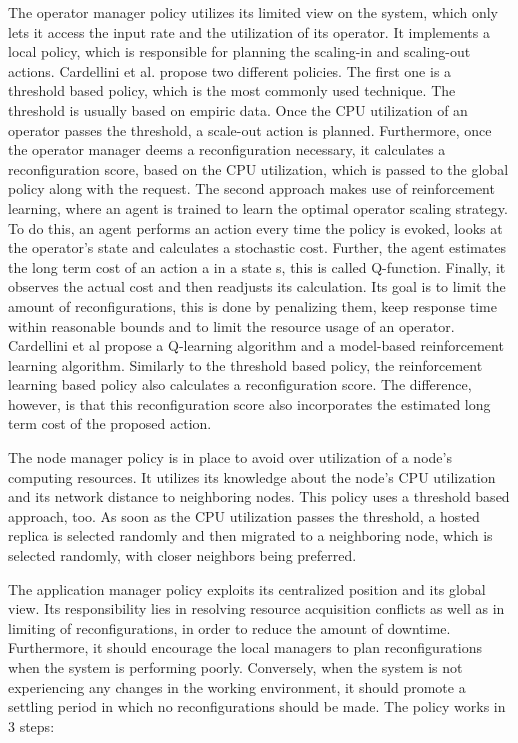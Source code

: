         \quad The operator manager policy utilizes its limited view on the system, which only lets it access the input rate and the utilization of its operator.
        It implements a local policy, which is responsible for planning the scaling-in and scaling-out actions. Cardellini et al. propose two different policies.
        The first one is a threshold based policy, which is the most commonly used technique. The threshold is usually based on empiric data. Once the CPU utilization 
        of an operator passes the threshold, a scale-out action is planned. 
        Furthermore, once the operator manager deems a reconfiguration necessary, it calculates a reconfiguration score, based on the CPU utilization, 
        which is passed to the global policy along with the request.
        The second approach makes use of reinforcement learning, where an agent is trained to learn the optimal operator scaling strategy.
        To do this, an agent performs an action every time the policy is evoked, looks at the operator's state and calculates a stochastic cost.
        Further, the agent estimates the long term cost of an action a in a state s, this is called Q-function.
        Finally, it observes the actual cost and then readjusts its calculation.
        Its goal is to limit the amount of reconfigurations, this is done by penalizing them, keep response time within reasonable bounds and to limit the resource usage of an operator.
        Cardellini et al propose a Q-learning algorithm and a model-based reinforcement learning algorithm.
        Similarly to the threshold based policy, the reinforcement learning based policy also calculates a reconfiguration score. The difference, however, is that 
        this reconfiguration score also incorporates the estimated long term cost of the proposed action.

        \quad The node manager policy is in place to avoid over utilization of a node's computing resources. 
        It utilizes its knowledge about the node's CPU utilization and its network distance to neighboring nodes.
        This policy uses a threshold based approach, too. As soon as the CPU utilization passes the threshold, a hosted replica is selected 
        randomly and then migrated to a neighboring node, which is selected randomly, with closer neighbors being preferred. 

        \quad The application manager policy exploits its centralized position and its global view. 
        Its responsibility lies in resolving resource acquisition conflicts as well as in limiting of reconfigurations, 
        in order to reduce the amount of downtime. Furthermore, it should encourage the local managers to plan reconfigurations when the system 
        is performing poorly. Conversely, when the system is not experiencing any changes in the working environment, it should promote a settling period 
        in which no reconfigurations should be made.
        The policy works in 3 steps:

